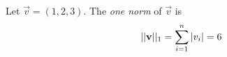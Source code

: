 \begin{example}
    Let $\vec{v} = (1, 2, 3)$. The \textit{one norm} of $\vec{v}$ is
    $$ ||\mathbf{v}||_1 = \sum_{i=1}^{n}{|v_i|} = 6 $$
\end{example}